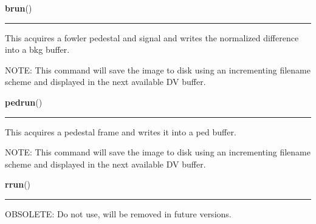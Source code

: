     \label{runrun:brun}

    \vspace{0.5ex}

    \begin{boxedminipage}{\textwidth}

    \raggedright \textbf{brun}()

    \vspace{-1.5ex}

    \rule{\textwidth}{0.5\fboxrule}
    This acquires a fowler pedestal and signal and writes the normalized 
    difference into a bkg buffer.

    NOTE: This command will save the image to disk using an incrementing 
    filename scheme and displayed in the next available DV buffer.

    \vspace{1ex}

    \end{boxedminipage}

    \label{runrun:pedrun}

    \vspace{0.5ex}

    \begin{boxedminipage}{\textwidth}

    \raggedright \textbf{pedrun}()

    \vspace{-1.5ex}

    \rule{\textwidth}{0.5\fboxrule}
    This acquires a pedestal frame and writes it into a ped buffer.

    NOTE: This command will save the image to disk using an incrementing 
    filename scheme and displayed in the next available DV buffer.

    \vspace{1ex}

    \end{boxedminipage}

    \label{runrun:rrun}

    \vspace{0.5ex}

    \begin{boxedminipage}{\textwidth}

    \raggedright \textbf{rrun}()

    \vspace{-1.5ex}

    \rule{\textwidth}{0.5\fboxrule}
    OBSOLETE: Do not use, will be removed in future versions.

    \vspace{1ex}

    \end{boxedminipage}

